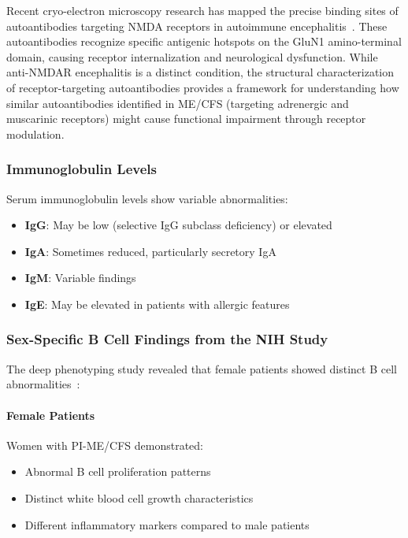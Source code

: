 Recent cryo-electron microscopy research has mapped the precise binding sites of autoantibodies targeting NMDA receptors in autoimmune encephalitis~\cite{Kim2026nmdar_cryoem}. These autoantibodies recognize specific antigenic hotspots on the GluN1 amino-terminal domain, causing receptor internalization and neurological dysfunction. While anti-NMDAR encephalitis is a distinct condition, the structural characterization of receptor-targeting autoantibodies provides a framework for understanding how similar autoantibodies identified in ME/CFS (targeting adrenergic and muscarinic receptors) might cause functional impairment through receptor modulation.

\subsubsection{Immunoglobulin Levels}

Serum immunoglobulin levels show variable abnormalities:
\begin{itemize}
    \item \textbf{IgG}: May be low (selective IgG subclass deficiency) or elevated
    \item \textbf{IgA}: Sometimes reduced, particularly secretory IgA
    \item \textbf{IgM}: Variable findings
    \item \textbf{IgE}: May be elevated in patients with allergic features
\end{itemize}

\subsubsection{Sex-Specific B Cell Findings from the NIH Study}

The deep phenotyping study revealed that female patients showed distinct B cell abnormalities~\cite{walitt2024deep}:

\paragraph{Female Patients}
Women with PI-ME/CFS demonstrated:
\begin{itemize}
    \item Abnormal B cell proliferation patterns
    \item Distinct white blood cell growth characteristics
    \item Different inflammatory markers compared to male patients
\end{itemize}

